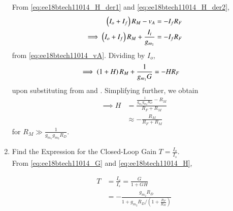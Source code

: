 \begin{enumerate}[label=\thesubsection.\arabic*.,ref=\thesubsection.\theenumi]
From \eqref{eq:ee18btech11014_H_der1}
 and \eqref{eq:ee18btech11014_H_der2},
\begin{align}
\left(I_o + I_f\right)R_M - v_{A} &= -I_fR_F
\\
\implies \left(I_o + I_f\right)R_M + \frac{I_i}{g_{m_1}} &=-I_fR_F
\end{align}
from  \eqref{eq:ee18btech11014_vA}. Dividing by  $I_o $,%
\begin{align}
\implies \left(1 + H\right)R_M + \frac{1}{g_{m_1}G} &=-HR_F 
\end{align}
%
upon substituting from \label{eq:ee18btech11014_G}
and \label{eq:ee18btech11014_Hdef}.  Simplifying further, we obtain
%
\begin{align}
\implies H &= \frac{\frac{1}{g_{m_1}g_{m_2}R_D} - R_M}{R_F+R_M}
\\
& \approx  -\frac{ R_M}{R_F+R_M}
\label{eq:ee18btech11014_H}
\end{align}
%
for $R_M \gg \frac{1}{g_{m_1}g_{m_2}R_D}$. 
%
\item Find the Expression for the Closed-Loop Gain $T=\frac{I_{o}}{I_{s}}$. 
\\
\solution 
From \eqref{eq:ee18btech11014_G}
 and \eqref{eq:ee18btech11014_H}, 

\begin{align}
\label{eq:ee18btech11014_T}
T &= \frac{I_{o}}{I_{s}} = \frac{G}{1+GH}\\
&=-\frac{g_{m_{2}} R_{D}}{1+g_{m_{2}} R_{D} /\left(1+\frac{R_{F}}{R_{M}}\right)}
\end{align}

\end{enumerate}
